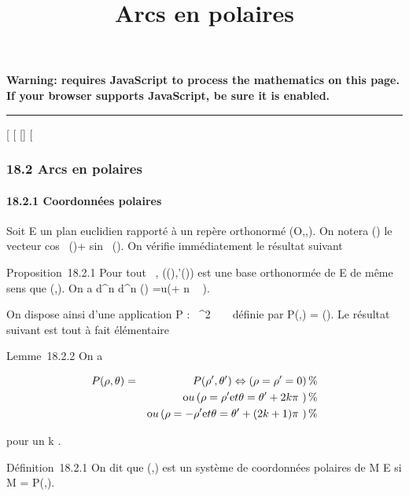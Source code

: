 \documentclass[]{article}
\title{Arcs en polaires}
\author{}
\date{}
\begin{document}
\maketitle

\textbf{Warning: 
requires JavaScript to process the mathematics on this page.\\ If your
browser supports JavaScript, be sure it is enabled.}

\begin{center}\rule{3in}{0.4pt}\end{center}

[
[
[]
[

\subsubsection{18.2 Arcs en polaires}

\paragraph{18.2.1 Coordonnées polaires}

Soit E un plan euclidien rapporté à un repère orthonormé
(O,\vec\imath,). On notera
\vecu(\theta) le vecteur cos~
(\theta)\vec\imath + sin~
(\theta). On vérifie immédiatement le résultat
suivant

Proposition~18.2.1 Pour tout \theta \in {}~,
(\vecu(\theta),\vecu'(\theta)) est une base
orthonormée de E de même sens que
(\vec\imath,). On a 
d^n \over d\theta^n
\vecu(\theta) =\vec u(\theta + n \pi~
 ).

On dispose ainsi d'une application P : ~^2 \rightarrow~ ~ définie par
P(\rho,\theta) = \rho\vecu(\theta). Le résultat suivant est tout à
fait élémentaire

Lemme~18.2.2 On a

\begin{align*} P(\rho,\theta)& =& P(\rho',\theta')
\Leftrightarrow \left (\rho = \rho' =
0\right ) \%& \\ & &
\text ou \left (\rho =
\rho'\text et \theta = \theta' + 2k\pi~\right ) \%&
\\ & & \text ou
\left (\rho = -\rho'\text et \theta = \theta' + (2k
+ 1)\pi~\right )\%& \\
\end{align*}

pour un k \in {}.

Définition~18.2.1 On dit que (\rho,\theta) est un système de coordonnées
polaires de M \in E si M = P(\rho,\theta).
\end{document}
